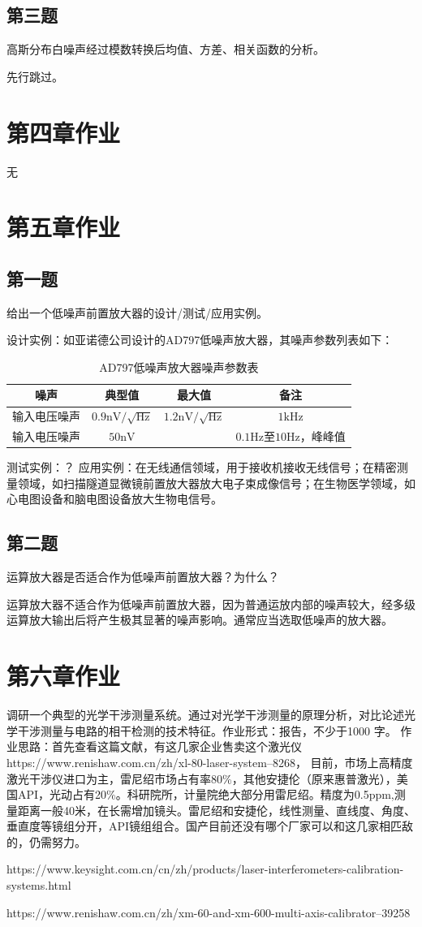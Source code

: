 \documentclass[11pt]{article}
\begin{document}
\subsection{第三题}
{\heiti 高斯分布白噪声经过模数转换后均值、方差、相关函数的分析。}\par
先行跳过。
\section{第四章作业}
无
\section{第五章作业}
\subsection{第一题}
{\heiti 给出一个低噪声前置放大器的设计/测试/应用实例。}\par
设计实例：如亚诺德公司设计的AD797低噪声放大器，其噪声参数列表如下：\par
\begin{table}[H]
  \centering
  \renewcommand{\arraystretch}{1.5}
  \caption{AD797低噪声放大器噪声参数表}
  \begin{tabular}{c|c|c|c}
    \hline
    噪声&典型值&最大值&备注\\\hline
    输入电压噪声&$0.9 \mathrm{nV}/\sqrt{\mathrm{Hz}}$&$1.2\mathrm{nV}/\sqrt{\mathrm{Hz}}$&$1 \mathrm{kHz}$\\\hline
    输入电压噪声&$50 \mathrm{nV}$&&$0.1 \mathrm{Hz}$至$10 \mathrm{Hz}$，峰峰值\\
    \hline
  \end{tabular}
\end{table}
测试实例：？
应用实例：在无线通信领域，用于接收机接收无线信号；在精密测量领域，如扫描隧道显微镜前置放大器放大电子束成像信号；在生物医学领域，如心电图设备和脑电图设备放大生物电信号。\par
\subsection{第二题}
{\heiti 运算放大器是否适合作为低噪声前置放大器？为什么？}\par
运算放大器不适合作为低噪声前置放大器，因为普通运放内部的噪声较大，经多级运算放大输出后将产生极其显著的噪声影响。通常应当选取低噪声的放大器。
\section{第六章作业}
{\heiti 调研一个典型的光学干涉测量系统。通过对光学干涉测量的原理分析，对比论述光学干涉测量与电路的相干检测的技术特征。作业形式：报告，不少于1000 字。}
作业思路：首先查看这篇文献\cite{HKJC202301007}，有这几家企业售卖这个激光仪https://www.renishaw.com.cn/zh/xl-80-laser-system--8268，
目前，市场上高精度激光干涉仪进口为主，雷尼绍市场占有率80\%，其他安捷伦（原来惠普激光），美国API，光动占有20\%。科研院所，计量院绝大部分用雷尼绍。精度为0.5ppm,测量距离一般40米，在长需增加镜头。雷尼绍和安捷伦，线性测量、直线度、角度、垂直度等镜组分开，API镜组组合。国产目前还没有哪个厂家可以和这几家相匹敌的，仍需努力。

https://www.keysight.com.cn/cn/zh/products/laser-interferometers-calibration-systems.html\par
https://www.renishaw.com.cn/zh/xm-60-and-xm-600-multi-axis-calibrator--39258
\newpage
\printbibliography[heading=bibliography,title=参考文献]
\end{document}
